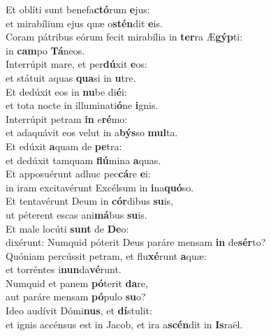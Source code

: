 \evenverse Et oblíti sunt benefa\textbf{ctó}rum \textbf{e}jus:~\*\\
\evenverse et mirabílium ejus quæ o\textbf{stén}dit \textbf{e}is.\\
\oddverse Coram pátribus eórum fecit mirabília in \textbf{ter}ra Æ\textbf{gýp}ti:~\*\\
\oddverse in \textbf{cam}po \textbf{Tá}neos.\\
\evenverse Interrúpit mare, et per\textbf{dú}xit \textbf{e}os:~\*\\
\evenverse et státuit aquas \textbf{qua}si in \textbf{u}tre.\\
\oddverse Et dedúxit eos in \textbf{nu}be di\textbf{é}i:~\*\\
\oddverse et tota nocte in illuminati\textbf{ó}ne \textbf{i}gnis.\\
\evenverse Interrúpit petram \textbf{in} e\textbf{ré}mo:~\*\\
\evenverse et adaquávit eos velut in a\textbf{býs}so \textbf{mul}ta.\\
\oddverse Et edúxit \textbf{a}quam de \textbf{pe}tra:~\*\\
\oddverse et dedúxit tamquam \textbf{flú}mina \textbf{a}quas.\\
\evenverse Et apposuérunt adhuc pec\textbf{cá}re \textbf{e}i:~\*\\
\evenverse in iram excitavérunt Excélsum in \textbf{i}na\textbf{quó}so.\\
\oddverse Et tentavérunt Deum in \textbf{cór}dibus \textbf{su}is,~\*\\
\oddverse ut péterent escas ani\textbf{má}bus \textbf{su}is.\\
\evenverse Et male locúti \textbf{sunt} de \textbf{De}o:~\*\\
\evenverse dixérunt: Numquid póterit Deus paráre mensam \textbf{in} de\textbf{sér}to?\\
\oddverse Quóniam percússit petram, et flu\textbf{xé}runt \textbf{a}quæ:~\*\\
\oddverse et torréntes i\textbf{nun}da\textbf{vé}runt.\\
\evenverse Numquid et panem \textbf{pó}terit \textbf{da}re,~\*\\
\evenverse aut paráre mensam \textbf{pó}pulo \textbf{su}o?\\
\oddverse Ideo audívit Dómi\textbf{nus}, et \textbf{dí}stulit:~\*\\
\oddverse et ignis accénsus est in Jacob, et ira a\textbf{scén}dit in \textbf{Is}raël.\\

